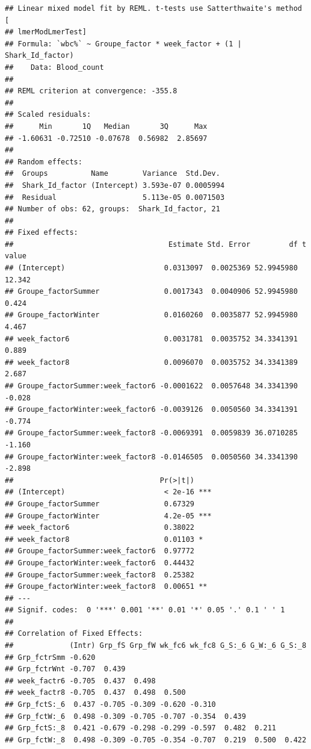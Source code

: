 \documentclass[
]{article}
\begin{document}
\begin{verbatim}
## Linear mixed model fit by REML. t-tests use Satterthwaite's method [
## lmerModLmerTest]
## Formula: `wbc%` ~ Groupe_factor * week_factor + (1 | Shark_Id_factor)
##    Data: Blood_count
## 
## REML criterion at convergence: -355.8
## 
## Scaled residuals: 
##      Min       1Q   Median       3Q      Max 
## -1.60631 -0.72510 -0.07678  0.56982  2.85697 
## 
## Random effects:
##  Groups          Name        Variance  Std.Dev. 
##  Shark_Id_factor (Intercept) 3.593e-07 0.0005994
##  Residual                    5.113e-05 0.0071503
## Number of obs: 62, groups:  Shark_Id_factor, 21
## 
## Fixed effects:
##                                    Estimate Std. Error         df t value
## (Intercept)                       0.0313097  0.0025369 52.9945980  12.342
## Groupe_factorSummer               0.0017343  0.0040906 52.9945980   0.424
## Groupe_factorWinter               0.0160260  0.0035877 52.9945980   4.467
## week_factor6                      0.0031781  0.0035752 34.3341391   0.889
## week_factor8                      0.0096070  0.0035752 34.3341389   2.687
## Groupe_factorSummer:week_factor6 -0.0001622  0.0057648 34.3341390  -0.028
## Groupe_factorWinter:week_factor6 -0.0039126  0.0050560 34.3341391  -0.774
## Groupe_factorSummer:week_factor8 -0.0069391  0.0059839 36.0710285  -1.160
## Groupe_factorWinter:week_factor8 -0.0146505  0.0050560 34.3341390  -2.898
##                                  Pr(>|t|)    
## (Intercept)                       < 2e-16 ***
## Groupe_factorSummer               0.67329    
## Groupe_factorWinter               4.2e-05 ***
## week_factor6                      0.38022    
## week_factor8                      0.01103 *  
## Groupe_factorSummer:week_factor6  0.97772    
## Groupe_factorWinter:week_factor6  0.44432    
## Groupe_factorSummer:week_factor8  0.25382    
## Groupe_factorWinter:week_factor8  0.00651 ** 
## ---
## Signif. codes:  0 '***' 0.001 '**' 0.01 '*' 0.05 '.' 0.1 ' ' 1
## 
## Correlation of Fixed Effects:
##             (Intr) Grp_fS Grp_fW wk_fc6 wk_fc8 G_S:_6 G_W:_6 G_S:_8
## Grp_fctrSmm -0.620                                                 
## Grp_fctrWnt -0.707  0.439                                          
## week_factr6 -0.705  0.437  0.498                                   
## week_factr8 -0.705  0.437  0.498  0.500                            
## Grp_fctS:_6  0.437 -0.705 -0.309 -0.620 -0.310                     
## Grp_fctW:_6  0.498 -0.309 -0.705 -0.707 -0.354  0.439              
## Grp_fctS:_8  0.421 -0.679 -0.298 -0.299 -0.597  0.482  0.211       
## Grp_fctW:_8  0.498 -0.309 -0.705 -0.354 -0.707  0.219  0.500  0.422
\end{verbatim}
\end{document}
